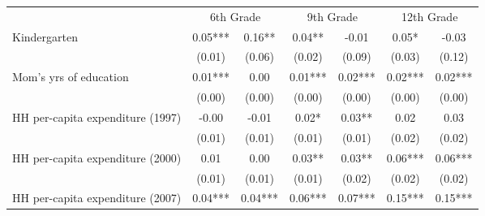 \begin{tabular}{lllllll}
\cline{1-7}
\multicolumn{1}{c}{} &
  \multicolumn{2}{c}{6th Grade} &
  \multicolumn{2}{c}{9th Grade} &
  \multicolumn{2}{c}{12th Grade} \\
\cline{1-7}
\multicolumn{1}{l}{Kindergarten} &
  \multicolumn{1}{c}{0.05***} &
  \multicolumn{1}{c}{0.16** } &
  \multicolumn{1}{c}{0.04** } &
  \multicolumn{1}{c}{-0.01 } &
  \multicolumn{1}{c}{0.05* } &
  \multicolumn{1}{c}{-0.03 } \\
\multicolumn{1}{l}{} &
  \multicolumn{1}{c}{(0.01)} &
  \multicolumn{1}{c}{(0.06)} &
  \multicolumn{1}{c}{(0.02)} &
  \multicolumn{1}{c}{(0.09)} &
  \multicolumn{1}{c}{(0.03)} &
  \multicolumn{1}{c}{(0.12)} \\
\multicolumn{1}{l}{Mom's yrs of education} &
  \multicolumn{1}{c}{0.01***} &
  \multicolumn{1}{c}{0.00 } &
  \multicolumn{1}{c}{0.01***} &
  \multicolumn{1}{c}{0.02***} &
  \multicolumn{1}{c}{0.02***} &
  \multicolumn{1}{c}{0.02***} \\
\multicolumn{1}{l}{} &
  \multicolumn{1}{c}{(0.00)} &
  \multicolumn{1}{c}{(0.00)} &
  \multicolumn{1}{c}{(0.00)} &
  \multicolumn{1}{c}{(0.00)} &
  \multicolumn{1}{c}{(0.00)} &
  \multicolumn{1}{c}{(0.00)} \\
\multicolumn{1}{l}{HH per-capita expenditure (1997)} &
  \multicolumn{1}{c}{-0.00 } &
  \multicolumn{1}{c}{-0.01 } &
  \multicolumn{1}{c}{0.02* } &
  \multicolumn{1}{c}{0.03** } &
  \multicolumn{1}{c}{0.02 } &
  \multicolumn{1}{c}{0.03 } \\
\multicolumn{1}{l}{} &
  \multicolumn{1}{c}{(0.01)} &
  \multicolumn{1}{c}{(0.01)} &
  \multicolumn{1}{c}{(0.01)} &
  \multicolumn{1}{c}{(0.01)} &
  \multicolumn{1}{c}{(0.02)} &
  \multicolumn{1}{c}{(0.02)} \\
\multicolumn{1}{l}{HH per-capita expenditure (2000)} &
  \multicolumn{1}{c}{0.01 } &
  \multicolumn{1}{c}{0.00 } &
  \multicolumn{1}{c}{0.03** } &
  \multicolumn{1}{c}{0.03** } &
  \multicolumn{1}{c}{0.06***} &
  \multicolumn{1}{c}{0.06***} \\
\multicolumn{1}{l}{} &
  \multicolumn{1}{c}{(0.01)} &
  \multicolumn{1}{c}{(0.01)} &
  \multicolumn{1}{c}{(0.01)} &
  \multicolumn{1}{c}{(0.02)} &
  \multicolumn{1}{c}{(0.02)} &
  \multicolumn{1}{c}{(0.02)} \\
\multicolumn{1}{l}{HH per-capita expenditure (2007)} &
  \multicolumn{1}{c}{0.04***} &
  \multicolumn{1}{c}{0.04***} &
  \multicolumn{1}{c}{0.06***} &
  \multicolumn{1}{c}{0.07***} &
  \multicolumn{1}{c}{0.15***} &
  \multicolumn{1}{c}{0.15***} \\

\end{tabular}
